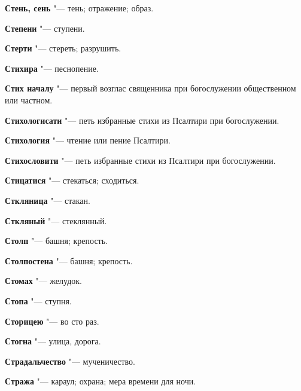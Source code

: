 \begin{mymulticols}{2}
\noindent\textbf{Стень, сень} "--- тень; отражение; образ. 




\noindent\textbf{Степени} "--- ступени. 




\noindent\textbf{Стерти} "--- стереть; разрушить. 




\noindent\textbf{Стихира} "--- песнопение. 




\noindent\textbf{Стих началу} "--- первый возглас священника при богослужении общественном или частном. 




\noindent\textbf{Стихологисати} "--- петь избранные стихи из Псалтири при богослужении. 




\noindent\textbf{Стихология} "--- чтение или пение Псалтири. 




\noindent\textbf{Стихословити} "--- петь избранные стихи из Псалтири при богослужении. 




\noindent\textbf{Стицатися} "--- стекаться; сходиться. 




\noindent\textbf{Сткляница} "--- стакан. 




\noindent\textbf{Сткляный} "--- стеклянный. 




\noindent\textbf{Столп} "--- башня; крепость. 




\noindent\textbf{Столпостена} "--- башня; крепость. 




\noindent\textbf{Стомах} "--- желудок. 




\noindent\textbf{Стопа} "--- ступня. 




\noindent\textbf{Сторицею} "--- во сто раз. 




\noindent\textbf{Стогна} "--- улица, дорога. 




\noindent\textbf{Страдальчество} "--- мученичество. 




\noindent\textbf{Стража} "--- караул; охрана; мера времени для ночи. 





\end{mymulticols}
